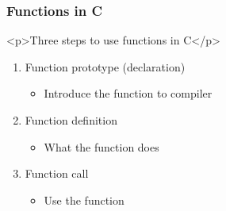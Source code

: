 \documentclass{../c-lecture}
\begin{document}
\begin{frame}
  \frametitle{Functions in C}
  <p>Three steps to use functions in C</p>
  \begin{enumerate}
    \item Function prototype (declaration)
    \begin{itemize}
      \item Introduce the function to compiler
    \end{itemize}
    \item Function definition
    \begin{itemize}
      \item What the function does
    \end{itemize}
    \item Function call
    \begin{itemize}
      \item Use the function
    \end{itemize}
  \end{enumerate}
\end{frame}
\end{document}
